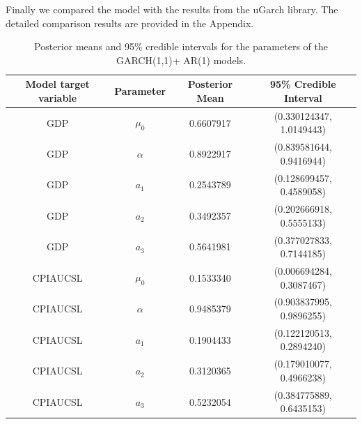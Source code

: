 Finally we compared the model with the results from the uGarch library. The detailed comparison results are provided in the Appendix. 
\begin{table}[H]
    \centering
    \begin{tabular}{|c|c|c|c|}
        \hline
        \textbf{Model target variable } & \textbf{Parameter } & \textbf{Posterior Mean } & \textbf{95\% Credible Interval } \\
        \hline
        GDP      & $\mu_0$  & 0.6607917 & (0.330124347, 1.0149443) \\
        GDP      & $\alpha$ & 0.8922917 & (0.839581644, 0.9416944) \\
        GDP      & $a_1$    & 0.2543789 & (0.128699457, 0.4589058) \\
        GDP      & $a_2$    & 0.3492357 & (0.202666918, 0.5555133) \\
        GDP      & $a_3$    & 0.5641981 & (0.377027833, 0.7144185) \\
        CPIAUCSL & $\mu_0$  & 0.1533340 & (0.006694284, 0.3087467) \\
        CPIAUCSL & $\alpha$ & 0.9485379 & (0.903837995, 0.9896255) \\
        CPIAUCSL & $a_1$    & 0.1904433 & (0.122120513, 0.2894240) \\
        CPIAUCSL & $a_2$    & 0.3120365 & (0.179010077, 0.4966238) \\
        CPIAUCSL & $a_3$    & 0.5232054 & (0.384775889, 0.6435153) \\
        \hline
    \end{tabular}
    \caption{Posterior means and 95\% credible intervals for the parameters of the GARCH(1,1)+ AR(1) models.}
    \label{tab:GARCH1,1_AR1_posteriors}
\end{table}